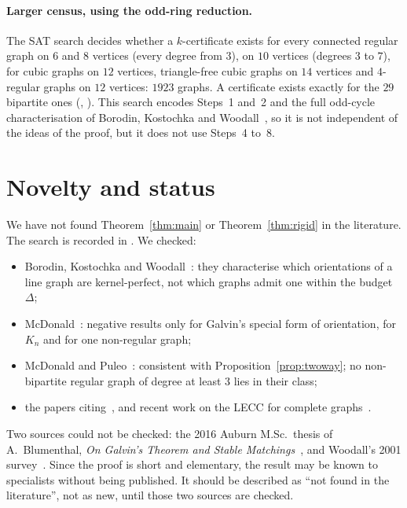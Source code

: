 \documentclass[11pt]{article}
\theoremstyle{plain}
\theoremstyle{definition}
\theoremstyle{remark}
\begin{document}
\paragraph{Larger census, using the odd-ring reduction.} The SAT search
 decides whether a $k$-certificate exists for every connected
regular graph on $6$ and $8$ vertices (every degree from $3$), on $10$ vertices (degrees $3$ to
$7$), for cubic graphs on $12$ vertices, triangle-free cubic graphs on $14$ vertices and
$4$-regular graphs on $12$ vertices: $1923$ graphs. A certificate exists exactly for the $29$
bipartite ones (,
). This search encodes Steps~1 and~2 and the full
odd-cycle characterisation of Borodin, Kostochka and Woodall~\cite{bkw}, so it is not
independent of the ideas of the proof, but it does not use Steps~4 to~8.

\section{Novelty and status}\label{sec:novelty}

We have not found Theorem~\ref{thm:main} or Theorem~\ref{thm:rigid} in the literature. The
search is recorded in . We checked:
\begin{itemize}
  \item Borodin, Kostochka and Woodall~\cite{bkw}: they characterise which orientations of a
    line graph are kernel-perfect, not which graphs admit one within the budget $\Delta$;
  \item McDonald~\cite{mcd}: negative results only for Galvin's special form of orientation, for
    $K_n$ and for one non-regular graph;
  \item McDonald and Puleo~\cite{mp}: consistent with Proposition~\ref{prop:twoway}; no
    non-bipartite regular graph of degree at least $3$ lies in their class;
  \item the papers citing~\cite{bkw}, and recent work on the LECC for complete
    graphs~\cite{jafari}.
\end{itemize}
Two sources could not be checked: the 2016 Auburn M.Sc.\ thesis of A.~Blumenthal, \emph{On
Galvin's Theorem and Stable Matchings}~\cite{blumenthal}, and Woodall's 2001
survey~\cite{woodall}. Since the proof is short and elementary, the result may be known to
specialists without being published. It should be described as ``not found in the
literature'', not as new, until those two sources are checked.
\end{document}
